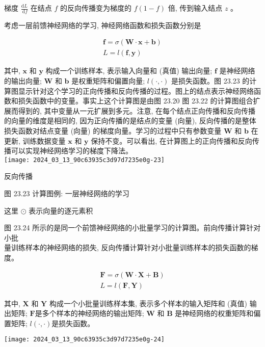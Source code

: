 \documentclass[10pt]{article}
\begin{document}
\begin{CJK*}{UTF8}{bsmi}
梯度 $\frac{\mathrm{d} L}{\mathrm{~d} f}$ 在结点 $f$ 的反向传播变为梯度的 $f(1-f)$ 倍, 传到输入结点 $z$ 。

考虑一层前馈神经网络的学习, 神经网络函数和损失函数分别是

$$
\begin{gathered}
\boldsymbol{f}=\sigma(\boldsymbol{W} \cdot \boldsymbol{x}+\boldsymbol{b}) \\
L=l(\boldsymbol{f}, \boldsymbol{y})
\end{gathered}
$$

其中, $\boldsymbol{x}$ 和 $\boldsymbol{y}$ 构成一个训练样本, 表示输入向量和 (真值) 输出向量; $\boldsymbol{f}$ 是神经网络的输出向量; $\boldsymbol{W}$ 和 $\boldsymbol{b}$ 是权重矩阵和偏置向量; $l(\cdot, \cdot)$ 是损失函数。图 23.23 的计算图显示针对这个学习的正向传播和反向传播的过程。图上的结点表示神经网络函数和损失函数中的变量。事实上这个计算图是由图 23.20 图 23.22 的计算图组合扩展而得到的, 其中变量从一元扩展到多元。注意, 在每个结点正向传播和反向传播的向量的维度是相同的, 因为正向传播的是结点的变量 (向量), 反向传播的是整体损失函数对结点变量 (向量) 的梯度向量。学习的过程中只有参数变量 $\boldsymbol{W}$ 和 $\boldsymbol{b}$ 在更新, 训练数据变量 $\boldsymbol{x}$ 和 $\boldsymbol{y}$ 保持不变。可以看出, 在计算图上的正向传播和反向传播可以实现神经网络学习的梯度下降法。\\
\texttt{[image: 2024\_03\_13\_90c63935c3d97d7235e0g-23]}

反向传播

图 23.23 计算图例: 一层神经网络的学习

这里 $\odot$ 表示向量的逐元素积

图 23.24 所示的是同一个前馈神经网络的小批量学习的计算图。前向传播计算针对小批\\
量训练样本的神经网络的损失, 反向传播计算针对小批量训练样本的损失函数的梯度。

$$
\begin{gathered}
\boldsymbol{F}=\sigma(\boldsymbol{W} \cdot \boldsymbol{X}+\boldsymbol{B}) \\
L=l(\boldsymbol{F}, \boldsymbol{Y})
\end{gathered}
$$

其中, $\boldsymbol{X}$ 和 $\boldsymbol{Y}$ 构成一个小批量训练样本集, 表示多个样本的输入矩阵和 (真值) 输出矩阵; $\boldsymbol{F}$是多个样本的神经网络的输出矩阵; $\boldsymbol{W}$ 和 $\boldsymbol{B}$ 是神经网络的权重矩阵和偏置矩阵; $l(\cdot, \cdot)$是损失函数。

\begin{center}
\texttt{[image: 2024\_03\_13\_90c63935c3d97d7235e0g-24]}
\end{center}


\end{CJK*}
\end{document}
